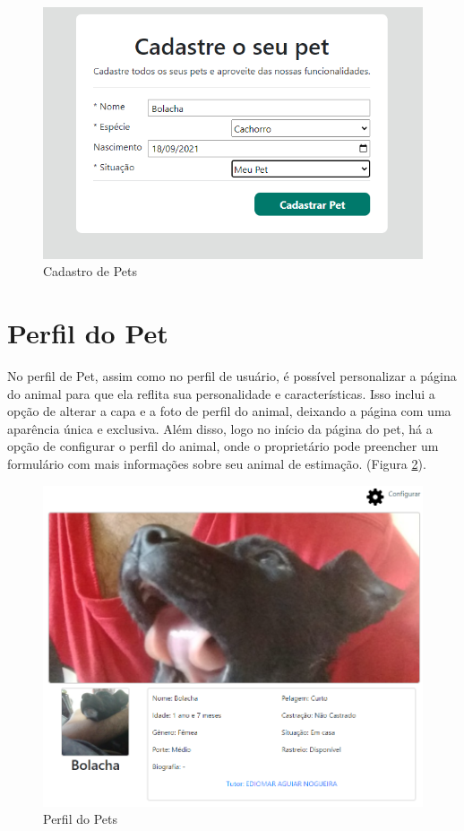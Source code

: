 \begin{figure}[htb]
     \centering
     \includegraphics[width=14cm]{arquivos/Figuras/image24.png}
     \caption{Cadastro de Pets}
     \label{fig:CadastroDePets}
\end{figure}

\newpage
\section{Perfil do Pet}

No perfil de Pet, assim como no perfil de usuário, é possível personalizar a página do animal para que ela reflita sua personalidade e características. Isso inclui a opção de alterar a capa e a foto de perfil do animal, deixando a página com uma aparência única e exclusiva. Além disso, logo no início da página do pet, há a opção de configurar o perfil do animal, onde o proprietário pode preencher um formulário com mais informações sobre seu animal de estimação. (Figura \ref{fig:PerfilDoPets}).

\begin{figure}[htb]
     \centering
     \includegraphics[width=14cm]{arquivos/Figuras/image5.png}
     \caption{Perfil do Pets}
     \label{fig:PerfilDoPets}
\end{figure}

